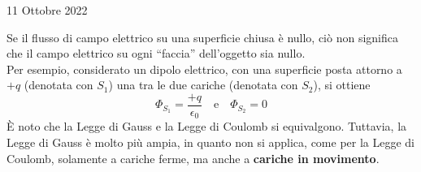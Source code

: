 \documentclass[a4paper]{extarticle}
\newcommand{\quotes}[1]{``#1''}
\begin{document}
\newpage
\noindent
\begin{center}
  11 Ottobre 2022
\end{center}
Se il flusso di campo elettrico su una superficie chiusa è nullo, ciò non significa che il campo elettrico su ogni \quotes{faccia} dell'oggetto sia nullo.\\
Per esempio, considerato un dipolo elettrico, con una superficie posta attorno a $+q$ (denotata con $S_1$) una tra le due cariche (denotata con $S_2$), si ottiene
\[\Phi_{S_1} = \frac{+q}{\epsilon_0} \hspace{1em} \text{e} \hspace{1em} \Phi_{S_2} = 0\]
È noto che la Legge di Gauss e la Legge di Coulomb si equivalgono. Tuttavia, la Legge di Gauss è molto più ampia, in quanto non si applica, come per la Legge di Coulomb, solamente a cariche ferme, ma anche a \textbf{cariche in movimento}.

\vspace{1em}
\end{document}
